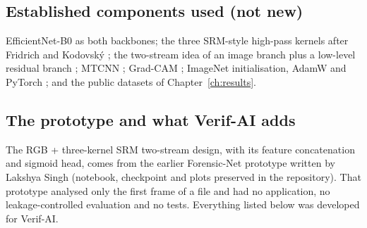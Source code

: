 \subsection{Established components used (not new)}
EfficientNet-B0 \citep{tan2019efficientnet} as both backbones; the three SRM-style high-pass kernels after Fridrich and Kodovsk\'y \citep{fridrich2012srm}; the two-stream idea of an image branch plus a low-level residual branch \citep{zhou2017twostream}; MTCNN \citep{zhang2016mtcnn}; Grad-CAM \citep{selvaraju2017gradcam}; ImageNet initialisation, AdamW \citep{loshchilov2019adamw} and PyTorch \citep{paszke2019pytorch}; and the public datasets of Chapter~\ref{ch:results}.

\subsection{The prototype and what Verif-AI adds}
\label{sec:prototype}
The RGB + three-kernel SRM two-stream design, with its feature concatenation and sigmoid head, comes from the earlier Forensic-Net prototype written by Lakshya Singh (notebook, checkpoint and plots preserved in the repository). That prototype analysed only the first frame of a file and had no application, no leakage-controlled evaluation and no tests. Everything listed below was developed for Verif-AI.

